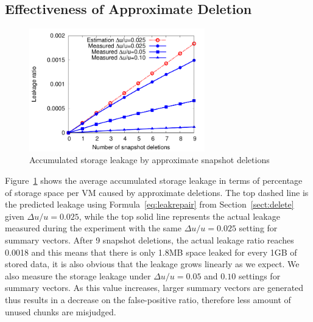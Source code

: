  \subsection{Effectiveness of Approximate Deletion}

 \begin{figure}
     \centering
     \includegraphics[width=3in]{figures/leakage}
     \caption{Accumulated storage leakage by approximate snapshot deletions}
     \label{fig:leakage}
 \end{figure}

Figure~\ref{fig:leakage} shows the average accumulated storage leakage in terms of percentage of
storage space per VM caused  by approximate deletions.
The top dashed line is the predicted leakage using Formula~\ref{eq:leakrepair} from Section~\ref{sect:delete}
given $\Delta u/u=0.025$,
while the top solid line represents the actual leakage measured during the experiment 
with the same $\Delta u/u=0.025$ setting for summary vectors.
After 9 snapshot deletions, the actual leakage ratio reaches 0.0018 and this means that
there is only 1.8MB space leaked for every 1GB of stored data, it is also obvious that
the leakage grows linearly as we expect. 
We also measure the storage leakage under $\Delta u/u=0.05$ and $0.10$ settings for summary vectors.
As this value increases, larger summary vectors are generated thus results in a decrease on the
false-positive ratio, therefore less amount of unused chunks are misjudged. 
